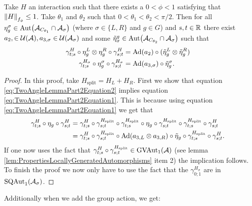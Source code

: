 \documentclass[12pt,a4paper,twoside]{article}
\numberwithin{equation}{section}
\begin{document}
\begin{lemma}\label{lem:TwoAngleLemmaPart2}
	Take $H$ an interaction such that there exists a $0<\phi<1$ satisfying that $\norm{H}_{f_\phi}\leq 1$. Take $\theta_1$ and $\theta_2$ such that $0<\theta_1<\theta_2<\pi/2$. Then for all $\eta_{g}^{\sigma}\in\Aut{\AA_{C_{\theta_1}}\cap\AA_{\sigma}}$ (where $\sigma\in\{L,R\}$ and $g\in G$) and $s,t\in\RR$ there exist $a_{2},\in\UU(\AA),a_{3,\sigma}\in\UU(\AA_\sigma)$ and some $\tilde{\eta}_{\sigma}^g\in \Aut{\AA_{C_{\theta_2}}\cap\AA_{\sigma}}$ such that
	\begin{align}
		\label{eq:TwoAngleLemmaPart2Equation1}
		\gamma^{H}_{t;s}\circ\eta_{g}^L\otimes\eta_{g}^R\circ\gamma^{H}_{s;t}&=\Ad{a_2}\circ(\tilde\eta_{g}^L \otimes\tilde\eta_{g}^R)\\
		\label{eq:TwoAngleLemmaPart2Equation2}
		\gamma^{H_\sigma}_{t;s}\circ\eta_g^\sigma\circ\gamma^{H_\sigma}_{s;t}&=\Ad{a_{3,\sigma}}\circ \tilde\eta_{g}^\sigma.
	\end{align}
\end{lemma}
\begin{proof}
	In this proof, take $H_{\text{split}}=H_L+H_R$. First we show that equation \eqref{eq:TwoAngleLemmaPart2Equation2} implies equation \eqref{eq:TwoAngleLemmaPart2Equation1}. This is because using equation \eqref{eq:TwoAngleLemmaPart2Equation1} we get that
	\begin{align}
		\gamma^H_{t;s}\circ\eta_g\circ\gamma^{H}_{s;t}&=\gamma^H_{t;s}\circ\gamma^{H_{\text{split}}}_{s;t}\circ\gamma^{H_{\text{split}}}_{t;s}\circ\eta_g\circ\gamma^{H_{\text{split}}}_{s;t}\circ\gamma^{H_{\text{split}}}_{t;s}\circ\gamma^H_{s;t}\\
		&=\gamma^H_{t;s}\circ\gamma^{H_{\text{split}}}_{s;t}\circ\Ad{a_{3,L}\otimes a_{3,R}}\circ\tilde{\eta}_g\circ\gamma^{H_{\text{split}}}_{t;s}\circ\gamma^H_{s;t}.
	\end{align}
	If one now uses the fact that $\gamma^H_{t;s}\circ\gamma^{H_{\text{split}}}_{s;t}\in\textrm{GVAut}_1(\AA)$ (see lemma \ref{lem:PropertiesLocallyGeneratedAutomorphisms} item 2) the implication follows. To finish the proof we now only have to use the fact that the $\gamma^{H_\sigma}_{0;1}$ are in $\textrm{SQAut}_1(\AA_\sigma)$.
\end{proof}
Additionally when we add the group action, we get:
\end{document}
